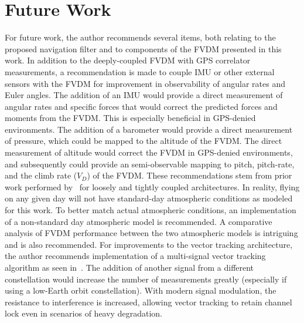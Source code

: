 \section{\textbf{Future Work}}
For future work, the author recommends several items, both relating to the proposed navigation filter and to components of the FVDM presented in this work. In addition to the deeply-coupled FVDM with GPS correlator measurements, a recommendation is made to couple IMU or other external sensors with the FVDM for improvement in observability of angular rates and Euler angles. The addition of an IMU would provide a direct measurement of angular rates and specific forces that would correct the predicted forces and moments from the FVDM\@. This is especially beneficial in GPS-denied environments. The addition of a barometer would provide a direct measurement of pressure, which could be mapped to the altitude of the FVDM\@. The direct measurement of altitude would correct the FVDM in GPS-denied environments, and subsequently could provide an semi-observable mapping to pitch, pitch-rate, and the climb rate (\(V_D\)) of the FVDM\@. These recommendations stem from prior work performed by~\cite{khaghaniAssessmentVDMbasedAutonomous2018,khaghaniAutonomousVehicleDynamic2016,mwenegohaModelbasedTightlyCoupled2020} for loosely and tightly coupled architectures. In reality, flying on any given day will not have standard-day atmospheric conditions as modeled for this work.  To better match actual atmospheric conditions, an implementation of a non-standard day atmospheric model is recommended. A comparative analysis of FVDM performance between the two atmospheric models is intriguing and is also recommended. For improvements to the vector tracking architecture, the author recommends implementation of a multi-signal vector tracking algorithm as seen in~\cite{givhanGPSL5Software2021}. The addition of another signal from a different constellation would increase the number of measurements greatly (especially if using a low-Earth orbit constellation). With modern signal modulation, the resistance to interference is increased, allowing vector tracking to retain channel lock even in scenarios of heavy degradation.